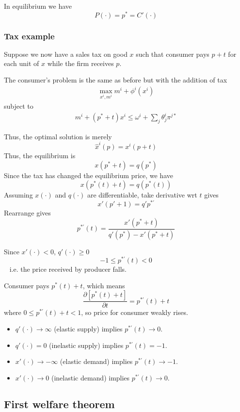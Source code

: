 \documentclass[twocolumn, fleqn]{article}
\begin{document}
		In equilibrium we have
		\[P(\cdot) = p^\ast = C'(\cdot)\]
		
		\subsubsection{Tax example}
		Suppose we now have a sales tax on good $x$ such that consumer pays $p+t$ for each unit of $x$ while the firm receives $p$.
		
		The consumer's problem is the same as before but with the addition of tax
		\begin{align*}
			\max_{x^i, m^i} m^i + \phi^i(x^i)
		\end{align*}
		subject to 
		\begin{align*}
			m^i + (p^\ast+t) x^i \leq \omega^i + \sum_j \theta^i_j \pi^{j\ast}
		\end{align*}
		
		Thus, the optimal solution is merely
		\[ \hat{x}^i(p) = x^i (p+t)\]
		Thus, the equilibrium is 
		\[ x(p^\ast +t ) = q(p^\ast)\]
		Since the tax has changed the equilibrium price, we have
		\[ x(p^\ast(t) +t ) = q(p^\ast(t))\]
		Assuming $x(\cdot)$ and $q(\cdot)$ are differentiable, take derivative wrt $t$ gives
		\[ x' (p'+1) = q' p^{\ast \prime}\]
		Rearrange gives
		\[ p^{\ast \prime} (t) = \frac{x'(p^\ast +t)}{q'(p^\ast) - x'(p^\ast +t)}\]
		
		Since $x'(\cdot) <0$, $q'(\cdot)\geq 0$
		\[ -1\leq p^{\ast \prime} (t) <0\] 
		i.e. the price received by producer falls.
		
		Consumer pays $p^\ast(t) +t$, which means 
		\[ \frac{\partial [p^\ast(t) +t]}{\partial t} = p^{\ast \prime}(t) +t\]
		where $0 \leq  p^{\ast \prime}(t) +t <1$, so price for consumer weakly rises.
		
		\begin{itemize}
    	\item \( q'(\cdot) \rightarrow \infty \) (elastic supply) implies \( p^{*'}(t) \rightarrow 0 \).
    	\item \( q'(\cdot) = 0 \) (inelastic supply) implies \( p^{*'}(t) = -1 \).
    	\item \( x'(\cdot) \rightarrow -\infty \) (elastic demand) implies \( p^{*'}(t) \rightarrow -1 \).
    	\item \( x'(\cdot) \rightarrow 0 \) (inelastic demand) implies \( p^{*'}(t) \rightarrow 0 \).
		\end{itemize}
		
		\subsection{First welfare theorem}
				
\end{document}
